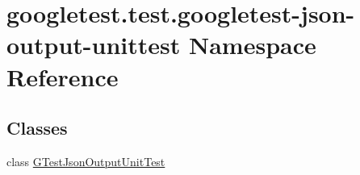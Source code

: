 \hypertarget{namespacegoogletest_1_1test_1_1googletest-json-output-unittest}{}\section{googletest.\+test.\+googletest-\/json-\/output-\/unittest Namespace Reference}
\label{namespacegoogletest_1_1test_1_1googletest-json-output-unittest}
\subsection*{Classes}
\begin{DoxyCompactItemize}
\item 
class \mbox{\hyperlink{classgoogletest_1_1test_1_1googletest-json-output-unittest_1_1_g_test_json_output_unit_test}{G\+Test\+Json\+Output\+Unit\+Test}}
\end{DoxyCompactItemize}
